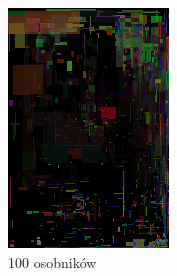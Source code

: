 \begin{figure}[!htb]
\begin{subfigure}[b]{0.3\textwidth}
         \includegraphics[width=\textwidth]{images/mona/num_of_best/100.png}
         \caption{100 osobników}
    \end{subfigure}
    \begin{subfigure}[b]{0.3\textwidth}
        \centering
        \label{fig:num_of_best_200}

\end{subfigure}
\end{figure}
